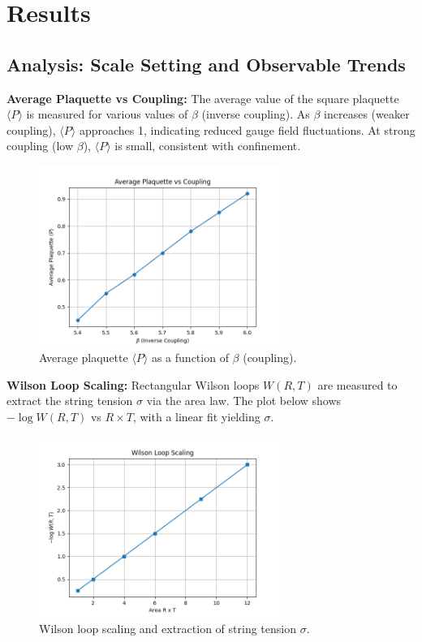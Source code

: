 \documentclass[12pt]{article}
\begin{document}
\section{Results}
\subsection{Analysis: Scale Setting and Observable Trends}
\textbf{Average Plaquette vs Coupling:}
The average value of the square plaquette $\langle P \rangle$ is measured for various values of $\beta$ (inverse coupling). As $\beta$ increases (weaker coupling), $\langle P \rangle$ approaches 1, indicating reduced gauge field fluctuations. At strong coupling (low $\beta$), $\langle P \rangle$ is small, consistent with confinement.

\begin{figure}[h]
    \centering
    \includegraphics[width=0.7\textwidth]{../plots/gauge_theory/plaquette_vs_beta.png}
    \caption{Average plaquette $\langle P \rangle$ as a function of $\beta$ (coupling).}
\end{figure}

\textbf{Wilson Loop Scaling:}
Rectangular Wilson loops $W(R,T)$ are measured to extract the string tension $\sigma$ via the area law. The plot below shows $-\log W(R,T)$ vs $R \times T$, with a linear fit yielding $\sigma$.

\begin{figure}[h]
    \centering
    \includegraphics[width=0.7\textwidth]{../plots/gauge_theory/wilson_loop_scaling.png}
    \caption{Wilson loop scaling and extraction of string tension $\sigma$.}
\end{figure}
\end{document}
